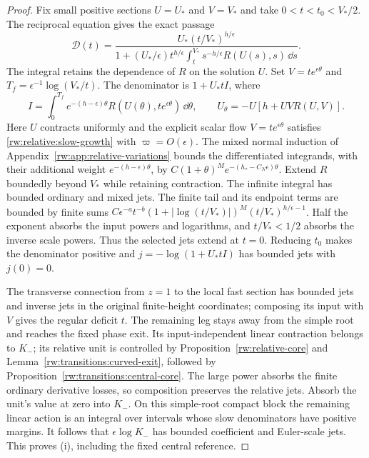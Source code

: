 \begin{proof}
Fix small positive sections $U=U_*$ and $V=V_*$ and take
$0<t<t_0<V_*/2$. The reciprocal equation gives the exact passage
\begin{equation}\label{rw:transitions:reciprocal-lower}
 \mathscr D(t)=
 \frac{U_*(t/V_*)^{h/\epsilon}}
 {1+(U_*/\epsilon)t^{h/\epsilon}
       \int_t^{V_*}s^{-h/\epsilon}R(U(s),s)\,\dd s}.
\end{equation}
The integral retains the dependence of $R$ on the solution $U$.
Set $V=t e^{\epsilon\theta}$ and
$T_f=\epsilon^{-1}\log(V_*/t)$. The denominator is $1+U_*tI$, where
\[
 I=\int_0^{T_f}e^{-(h-\epsilon)\theta}
       R(U(\theta),t e^{\epsilon\theta})\,\dd\theta,
 \qquad U_\theta=-U[h+UVR(U,V)].
\]
Here $U$ contracts uniformly and the explicit scalar flow
$V=te^{\epsilon\theta}$ satisfies \eqref{rw:relative:slow-growth}
with $\varpi=O(\epsilon)$. The mixed normal induction of
Appendix~\ref{rw:app:relative-variations} bounds the differentiated
integrands, with their additional weight $e^{-(h-\epsilon)\theta}$, by
$C(1+\theta)^M e^{-(h_*-C_N\epsilon)\theta}$.
Extend $R$ boundedly beyond $V_*$ while retaining contraction.
The infinite integral has bounded ordinary and mixed jets. The finite
tail and its endpoint terms are bounded by finite sums
$C\epsilon^{-a}t^{-b}(1+|\log(t/V_*)|)^M(t/V_*)^{h/\epsilon-1}$.
Half the exponent absorbs the input powers and logarithms, and
$t/V_*<1/2$ absorbs the inverse scale powers. Thus the selected jets
extend at $t=0$. Reducing $t_0$ makes the denominator positive and
$j=-\log(1+U_*tI)$ has bounded jets with $j(0)=0$.

The transverse connection from $z=1$ to the local fast section has
bounded jets and inverse jets in the original finite-height coordinates;
composing its input with $V$ gives the regular deficit $t$.
The remaining leg stays away from the simple root and reaches the fixed
phase exit. Its input-independent linear contraction belongs to $K_-$;
its relative unit is controlled by Proposition~\ref{rw:relative-core}
and Lemma~\ref{rw:transitions:curved-exit}, followed by
Proposition~\ref{rw:transitions:central-core}. The large power absorbs
the finite ordinary derivative losses, so composition preserves the
relative jets. Absorb the unit's value at zero into $K_-$.
On this simple-root compact block the remaining linear action is an
integral over intervals whose slow denominators have positive margins.
It follows that $\epsilon\log K_-$ has bounded coefficient and
Euler-scale jets. This proves (i), including the fixed central reference.


\end{proof}
